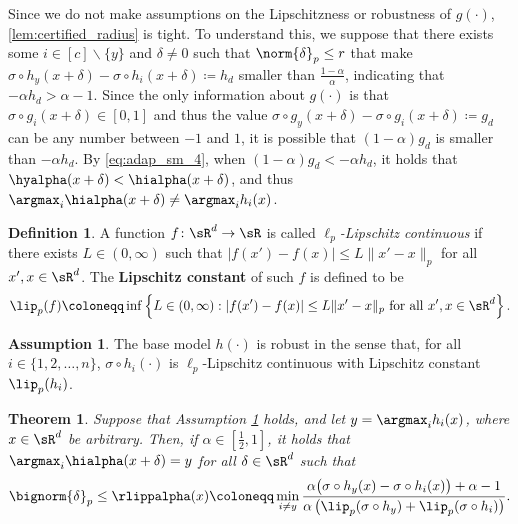 \documentclass[11pt, letterpaper]{article}
\theoremstyle{plain}
\newtheorem{theorem}{Theorem}
\theoremstyle{definition}
\newtheorem{definition}{Definition}
\newtheorem{assumption}{Assumption}
\begin{document}
Since we do not make assumptions on the Lipschitzness or robustness of $g (\cdot)$, \cref{lem:certified_radius} is tight. To understand this, we suppose that there exists some $i \in [c] \backslash \{ y \}$ and $\delta \neq 0$ such that $\norm{\delta}_p \leq r$ that make $\sigma \circ h_y (x+\delta) - \sigma \circ h_i (x+\delta) \coloneqq h_d$ smaller than $\frac{1-\alpha} {\alpha}$, indicating that $- \alpha h_d > \alpha-1$. Since the only information about $g (\cdot)$ is that $\sigma \circ g_i (x+\delta) \in [0, 1]$ and thus the value $\sigma \circ g_y (x+\delta) - \sigma \circ g_i (x+\delta) \coloneqq g_d$ can be any number between $-1$ and $1$, it is possible that $(1 - \alpha) g_d$ is smaller than $-\alpha h_d$. By \cref{eq:adap_sm_4}, when $(1 - \alpha) g_d < -\alpha h_d$, it holds that $\hyalpha (x+\delta) < \hialpha (x+\delta)$, and thus $\argmax_{i} \hialpha (x+\delta) \neq \argmax_{i} h_i (x)$.

\begin{definition}
	\label{def:lipschitz}
	A function $f \colon \sR^d \to \sR$ is called \emph{$\ell_p$-Lipschitz continuous} if there exists $L \in (0, \infty)$ such that $|f(x')-f(x)| \le L\|x'-x\|_p$ for all $x', x \in \sR^d$. The \textbf{Lipschitz constant} of such $f$ is defined to be 
	\begin{equation*}
		\lip_p(f) \coloneqq \inf \left\{ L \in (0,\infty) : |f(x')-f(x)| \le L \|x'-x\|_p ~ \text{for all $x', x \in \sR^d$} \right\}.
	\end{equation*}
\end{definition}

\begin{assumption}
	\label{as:lipschitz}
	The base model $h (\cdot)$ is robust in the sense that, for all $i \in \{1, 2, \dots, n\}$, $\sigma \circ h_i (\cdot)$ is $\ell_p$-Lipschitz continuous with Lipschitz constant $\lip_p (h_i)$.
\end{assumption}

\begin{theorem}
	\label{thm:certified_radius}
	Suppose that Assumption \ref{as:lipschitz} holds, and let $y = \argmax_i h_i(x)$, where $x \in \sR^d$ be arbitrary. Then, if $\alpha \in [\frac{1}{2}, 1]$, it holds that $\argmax_{i} \hialpha (x+\delta) = y$ for all $\delta \in \sR^d$ such that
	\begin{equation} \label{eq:lip_cert_rad}
		\bignorm{\delta}_p \le \rlippalpha (x) \coloneqq \min_{i \ne y} \frac{\alpha \big( \sigma \circ h_y(x) - \sigma \circ h_i(x) \big) + \alpha - 1} {\alpha \left( \lip_p (\sigma \circ h_y) + \lip_p (\sigma \circ h_i) \right)}.
	\end{equation}
\end{theorem}
\end{document}
